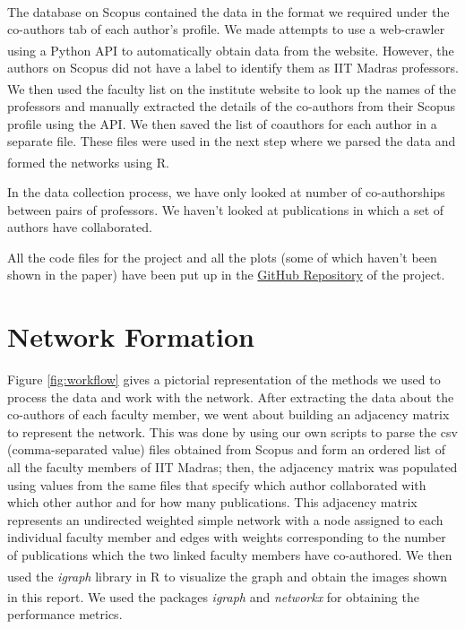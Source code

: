 \documentclass[conference,compsoc]{IEEEtran}
\begin{document}
The database on Scopus\textsuperscript{\hyperref[sec:thebibliography]{\cite{scopus}}} contained the data in the format we required under the co-authors tab of each author’s profile. We made attempts to use a web-crawler using a Python API\textsuperscript{\hyperref[sec:thebibliography]{\cite{scopus-api}}} to automatically obtain data from the website. However, the authors on Scopus did not have a label to identify them as IIT Madras professors. We then used the faculty list on the institute website \textsuperscript{\hyperref[sec:thebibliography]{\cite{iitm-web}}} to look up the names of the professors and manually extracted the details of the co-authors from their Scopus profile using the API. We then saved the list of coauthors for each author in a separate file. These files were used in the next step where we parsed the data and formed the networks using R\textsuperscript{\hyperref[sec:thebibliography]{\cite{cran-r}}}.

In the data collection process, we have only looked at number of co-authorships between pairs of professors. We haven't looked at publications in which a set of authors have collaborated. 

All the code files for the project and all the plots (some of which haven't been shown in the paper) have been put up in the \href{https://github.com/ashutoshkrjha/EE5154_Repo}{GitHub Repository} of the project.
\section{Network Formation}

Figure \ref{fig:workflow} gives a pictorial representation of the methods we used to process the data and work with the network. After extracting the data about the co-authors of each faculty member, we went about building an adjacency matrix to represent the network. This was done by using our own scripts to parse the csv (comma-separated value) files obtained from Scopus and form an ordered list of all the faculty members of IIT Madras; then, the adjacency matrix was populated using values from the same files that specify which author collaborated with which other author and for how many publications. This adjacency matrix represents an undirected weighted simple network with a node assigned to each individual faculty member and edges with weights corresponding to the number of publications which the two linked faculty members have co-authored. We then used the \emph{igraph}\textsuperscript{\hyperref[sec:thebibliography]{\cite{igraph}}} library in R to visualize the graph and obtain the images shown in this report. We used the packages \emph{igraph}\textsuperscript{\hyperref[sec:thebibliography]{\cite{igraph}}} and \emph{networkx}\textsuperscript{\hyperref[sec:thebibliography]{\cite{networkx}}} for obtaining the performance metrics.
\end{document}
